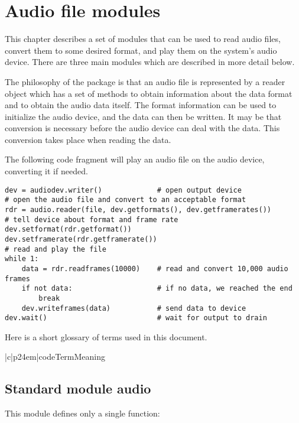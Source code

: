 \chapter{Audio file modules}

This chapter describes a set of modules that can be used to read audio
files, convert them to some desired format, and play them on the
system's audio device.  There are three main modules which are
described in more detail below.

The philosophy of the package is that an audio file is represented by
a reader object which has a set of methods to obtain information about
the data format and to obtain the audio data itself.  The format
information can be used to initialize the audio device, and the data
can then be written.  It may be that conversion is necessary before
the audio device can deal with the data.  This conversion takes place
when reading the data.

The following code fragment will play an audio file on the audio
device, converting it if needed.

\begin{verbatim}
dev = audiodev.writer()             # open output device
# open the audio file and convert to an acceptable format
rdr = audio.reader(file, dev.getformats(), dev.getframerates())
# tell device about format and frame rate
dev.setformat(rdr.getformat())
dev.setframerate(rdr.getframerate())
# read and play the file
while 1:
    data = rdr.readframes(10000)    # read and convert 10,000 audio frames
    if not data:                    # if no data, we reached the end
        break
    dev.writeframes(data)           # send data to device
dev.wait()                          # wait for output to drain
\end{verbatim}

Here is a short glossary of terms used in this document.

\begin{tableii}{|c|p{24em}|}{code}{Term}{Meaning}
\end{tableii}

\section{Standard module audio}
\renewcommand{\indexsubitem}{(in module audio)}

This module defines only a single function:

